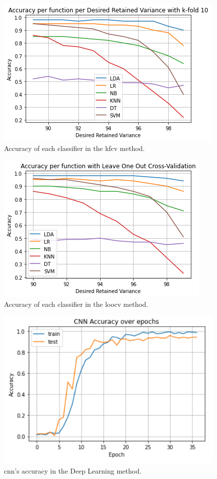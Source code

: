\documentclass[conference]{IEEEtran}
\begin{document}
\begin{figure}
    \centering
    \includegraphics[scale=0.58]{images/16_Accuracy_per_function_per_Desired_Retained_Variance_with_k-fold_10.png}
    \caption{Accuracy of each classifier in the \gls{kfcv} method.}
    \label{fig:k-fold-accuracy}
\end{figure}

\begin{figure}
    \centering
    \includegraphics[scale=0.6]{images/17_Accuracy_per_function_with_Leave_One_Out_Cross-Validation.png}
    \caption{Accuracy of each classifier in the \gls{loocv} method.}
    \label{fig:leave-one}
\end{figure}

\begin{figure}
    \centering
    \includegraphics[scale=0.75]{images/10_cnn_accuracy.png}
    \caption{\gls{cnn}'s accuracy in the Deep Learning method.}
    \label{fig:deep-learning-accuracy}
\end{figure}
\end{document}
